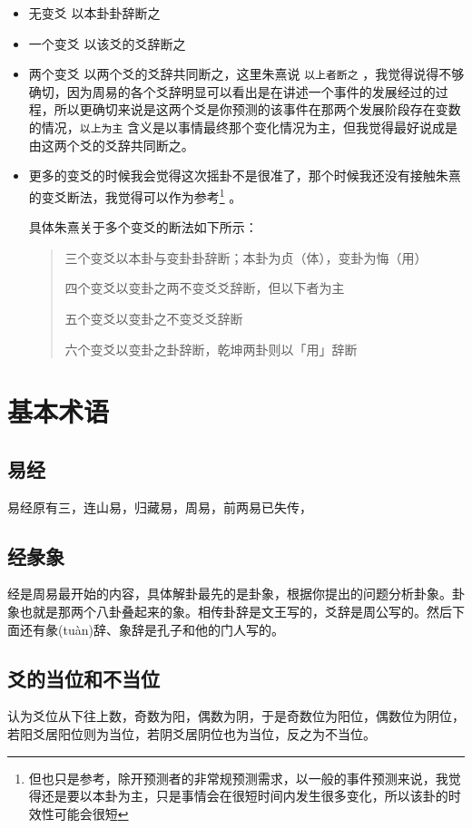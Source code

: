 \documentclass[12pt,oneside]{book}
\begin{document}
\begin{itemize}
\item 无变爻 以本卦卦辞断之
\item 一个变爻 以该爻的爻辞断之
\item 两个变爻 以两个爻的爻辞共同断之，这里朱熹说 \verb+以上者断之+ ，我觉得说得不够确切，因为周易的各个爻辞明显可以看出是在讲述一个事件的发展经过的过程，所以更确切来说是这两个爻是你预测的该事件在那两个发展阶段存在变数的情况，\verb+以上为主+ 含义是以事情最终那个变化情况为主，但我觉得最好说成是由这两个爻的爻辞共同断之。
\item 更多的变爻的时候我会觉得这次摇卦不是很准了，那个时候我还没有接触朱熹的变爻断法，我觉得可以作为参考\footnote{但也只是参考，除开预测者的非常规预测需求，以一般的事件预测来说，我觉得还是要以本卦为主，只是事情会在很短时间内发生很多变化，所以该卦的时效性可能会很短} 。

具体朱熹关于多个变爻的断法如下所示：
\begin{quotation}
三个变爻以本卦与变卦卦辞断；本卦为贞（体），变卦为悔（用）

四个变爻以变卦之两不变爻爻辞断，但以下者为主

五个变爻以变卦之不变爻爻辞断

六个变爻以变卦之卦辞断，乾坤两卦则以「用」辞断
\end{quotation}

\end{itemize}



\chapter{基本术语}
\section{易经}
易经原有三，连山易，归藏易，周易，前两易已失传，

\section{经彖象}
经是周易最开始的内容，具体解卦最先的是卦象，根据你提出的问题分析卦象。卦象也就是那两个八卦叠起来的象。相传卦辞是文王写的，爻辞是周公写的。然后下面还有彖(tuàn)辞、象辞是孔子和他的门人写的。

\section{爻的当位和不当位}
认为爻位从下往上数，奇数为阳，偶数为阴，于是奇数位为阳位，偶数位为阴位，若阳爻居阳位则为当位，若阴爻居阴位也为当位，反之为不当位。
\end{document}
